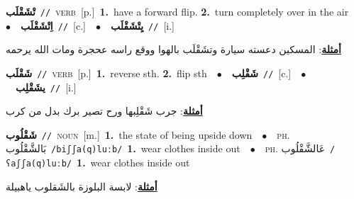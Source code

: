 \documentclass[10pt,a4paper,twoside]{article} %
\begin{document}
\begin{multicols}{2}
{\setlength\topsep{0pt}\textbf{\foreignlanguage{arabic}{تْشَقْلَب}}\ {\color{gray}\texttt{//}\color{black}}\ \textsc{verb}\ [p.]\ \textbf{1.}~have a forward flip.  \textbf{2.}~turn completely over in the air\ \ $\bullet$\ \ \setlength\topsep{0pt}\textbf{\foreignlanguage{arabic}{اِتْشَقْلَب}}\ {\color{gray}\texttt{//}\color{black}}\ [c.]\ \ $\bullet$\ \ \setlength\topsep{0pt}\textbf{\foreignlanguage{arabic}{يِتْشَقْلَب}}\ {\color{gray}\texttt{//}\color{black}}\ [i.]\  \begin{flushright}\color{gray}\foreignlanguage{arabic}{\textbf{\underline{\foreignlanguage{arabic}{أمثلة}}}: المسكين دعسته سيارة وتشَقْلَب بالهوا ووقع راسه عحجرة ومات الله يرحمه}\end{flushright}\color{black}} \vspace{2mm}

{\setlength\topsep{0pt}\textbf{\foreignlanguage{arabic}{شَقْلَب}}\ {\color{gray}\texttt{//}\color{black}}\ \textsc{verb}\ [p.]\ \textbf{1.}~reverse sth.  \textbf{2.}~flip sth\ \ $\bullet$\ \ \setlength\topsep{0pt}\textbf{\foreignlanguage{arabic}{شَقْلِب}}\ {\color{gray}\texttt{//}\color{black}}\ [c.]\ \ $\bullet$\ \ \setlength\topsep{0pt}\textbf{\foreignlanguage{arabic}{يشَقْلِب}}\ {\color{gray}\texttt{//}\color{black}}\ [i.]\  \begin{flushright}\color{gray}\foreignlanguage{arabic}{\textbf{\underline{\foreignlanguage{arabic}{أمثلة}}}: جرب شَقْلِبها ورح تصير برك بدل من كرب}\end{flushright}\color{black}} \vspace{2mm}

{\setlength\topsep{0pt}\textbf{\foreignlanguage{arabic}{شَقْلُوب}}\ {\color{gray}\texttt{//}\color{black}}\ \textsc{noun}\ [m.]\ \textbf{1.}~the state of being upside down\ \ $\bullet$\ \ \textsc{ph.} \color{gray} \foreignlanguage{arabic}{بَالشَّقْلُوب}\color{black}\ {\color{gray}\texttt{/{\sffamily biʃʃa(q)luːb}/}\color{black}}\ \textbf{1.}~wear clothes inside out\ \ $\bullet$\ \ \textsc{ph.} \color{gray} \foreignlanguage{arabic}{عَالشَّقْلُوب}\color{black}\ {\color{gray}\texttt{/{\sffamily ʕaʃʃa(q)luːb}/}\color{black}}\ \textbf{1.}~wear clothes inside out\  \begin{flushright}\color{gray}\foreignlanguage{arabic}{\textbf{\underline{\foreignlanguage{arabic}{أمثلة}}}: لابسة البلوزة بالشَقلوب ياهبيلة}\end{flushright}\color{black}} \vspace{2mm}


\end{multicols}
\end{document}
